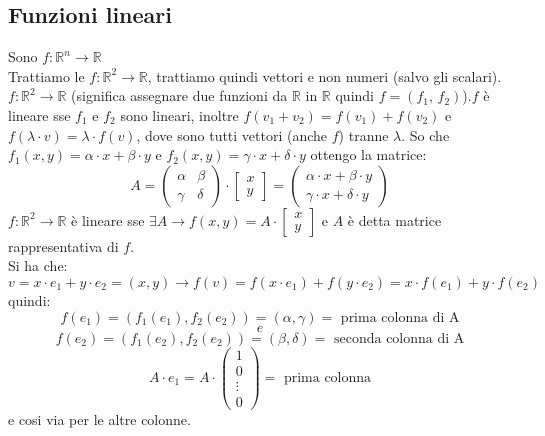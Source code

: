 \documentclass[a4paper,12pt, oneside]{book}
\begin{document}
\subsection{Funzioni lineari}
Sono $f:\mathbb{R}^n\rightarrow \mathbb{R}$ \\
Trattiamo le $f:\mathbb{R}^2\rightarrow \mathbb{R}$, trattiamo quindi vettori e non numeri (salvo gli scalari). $f:\mathbb{R}^2\rightarrow \mathbb{R}$ (significa assegnare due funzioni da $\mathbb{R}$ in $\mathbb{R}$ quindi $f=(f_1,\,f_2)$).$f$ è lineare sse $f_1$ e $f_2$ sono lineari, inoltre $f(v_1+v_2)=f(v_1)+f(v_2)$ e $ f(\lambda\cdot v)=\lambda\cdot f(v)$, dove sono tutti vettori (anche $f$) tranne $\lambda$. So che $f_1(x,y)=\alpha\cdot x +\beta\cdot y$ e $f_2(x,y)=\gamma\cdot x +\delta\cdot y$ ottengo la matrice:
$$
A=\left(\begin{matrix}
\alpha & \beta\\
\gamma & \delta
\end{matrix}\right)\cdot
\left[\begin{matrix}
x\\
y
\end{matrix}\right]=
\left(\begin{matrix}
\alpha\cdot x +\beta\cdot y\\
\gamma\cdot x +\delta\cdot y
\end{matrix}\right)
$$
$f:\mathbb{R}^2\rightarrow \mathbb{R}$ è lineare sse $\exists A\rightarrow f(x,y)=A\cdot 
\left[\begin{matrix}
x\\
y
\end{matrix}\right]$ e $A$ è detta matrice rappresentativa di $f$.\\

Si ha che:$$v=x\cdot e_1+y\cdot e_2=(x,y)\rightarrow f(v)=f(x\cdot e_1)+ f(y\cdot e_2) = x\cdot f(e_1)+y\cdot f(e_2)$$
quindi:
$$f(e_1)=(f_1(e_1),f_2(e_2))=(\alpha,\gamma)=\mbox{ prima colonna di A}$$
$$e$$
$$f(e_2)=(f_1(e_2),f_2(e_2))=(\beta,\delta)=\mbox{ seconda colonna di A}$$
$$A\cdot e_1=A\cdot
\left(\begin{matrix}
1\\
0\\
\vdots\\
0
\end{matrix}\right)=\mbox{ prima colonna}
$$
e cosi via per le altre colonne.
\end{document}
